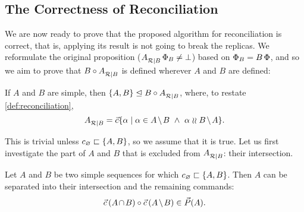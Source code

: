 
\subsection{The Correctness of Reconciliation}

We are now ready to prove that the proposed algorithm for reconciliation is correct,
that is, applying its result is not going to break the replicas.
We reformulate the original proposition (${A}^{}_{\mathcal{R}|{B}}\,\Phi_B\neq\bot$)
based on $\Phi_B=B\,\Phi$, and so we aim to prove that
$B\circ{A}^{}_{\mathcal{R}|{B}}$ is defined wherever $A$ and $B$ are defined:

\begin{myth}\label{reconciliation_correct}
If $A$ and $B$ are simple, then ${\{{A,B}\}}\trianglelefteq{B\circ{A}^{}_{\mathcal{R}|{B}}}$,
where, to restate \cref{def:reconciliation},
\[ \reca = \ords{\alpha \whr \alpha\in \ambnp  \ \wedge\   \alpha\indep \bmanp }. \]
\end{myth}

This is trivial unless $c_\varnothing\sqsubset{\{{A,B}\}}$, so we assume that it is true.
Let us first investigate the part of $A$ and $B$ that is excluded from
${A}^{}_{\mathcal{R}|{B}}$: their intersection.

\begin{mylem}\label{can_move_intersection}
Let $A$ and $B$ be two simple sequences for which $c_\varnothing\sqsubset{\{{A, B}\}}$.
Then $A$ can be separated into their intersection and the remaining commands:
\[ \acb\cc\amb \in \orderset{A}. \]
\end{mylem}

